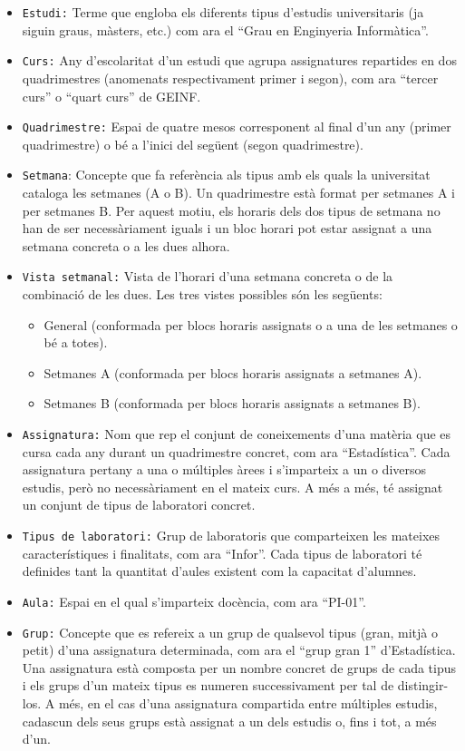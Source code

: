 \documentclass[a4paper,12pt]{ThesisStyle}
\begin{document}
\begin{itemize}
  \item \texttt{Estudi:} Terme que engloba els diferents tipus d'estudis universitaris (ja siguin graus, màsters, etc.) com ara el ``Grau en Enginyeria Informàtica''.
  \item \texttt{Curs:} Any d'escolaritat d'un estudi que agrupa assignatures repartides en dos quadrimestres (anomenats respectivament primer i segon), com ara ``tercer curs'' o ``quart curs'' de GEINF.
  \item \texttt{Quadrimestre:} Espai de quatre mesos corresponent al final d'un any (primer quadrimestre) o bé a l'inici del següent (segon quadrimestre).
  \item \texttt{Setmana}: Concepte que fa referència als tipus amb els quals la universitat cataloga les setmanes (A o B). Un quadrimestre està format per setmanes A i per setmanes B. Per aquest motiu, els horaris dels dos tipus de setmana no han de ser necessàriament iguals i un bloc horari pot estar assignat a una setmana concreta o a les dues alhora.
  \item \texttt{Vista setmanal:} Vista de l'horari d'una setmana concreta o de la combinació de les dues. Les tres vistes possibles són les següents:
  \begin{itemize}
    \item General (conformada per blocs horaris assignats o a una de les setmanes o bé a totes).
    \item Setmanes A (conformada per blocs horaris assignats a setmanes A).
    \item Setmanes B (conformada per blocs horaris assignats a setmanes B).
  \end{itemize}
  \item \texttt{Assignatura:} Nom que rep el conjunt de coneixements d'una matèria que es cursa cada any durant un quadrimestre concret, com ara ``Estadística''. Cada assignatura pertany a una o múltiples àrees i s'imparteix a un o diversos estudis, però no necessàriament en el mateix curs. A més a més, té assignat un conjunt de tipus de laboratori concret.
  \item \texttt{Tipus de laboratori:} Grup de laboratoris que comparteixen les mateixes característiques i finalitats, com ara ``Infor''. Cada tipus de laboratori té definides tant la quantitat d'aules existent com la capacitat d'alumnes.
  \item \texttt{Aula:} Espai en el qual s'imparteix docència, com ara ``PI-01''.
  \item \texttt{Grup:} Concepte que es refereix a un grup de qualsevol tipus (gran, mitjà o petit) d'una assignatura determinada, com ara el ``grup gran 1'' d'Estadística. Una assignatura està composta per un nombre concret de grups de cada tipus i els grups d'un mateix tipus es numeren successivament per tal de distingir-los. A més, en el cas d'una assignatura compartida entre múltiples estudis, cadascun dels seus grups està assignat a un dels estudis o, fins i tot, a més d'un.

\end{itemize}
\end{document}
